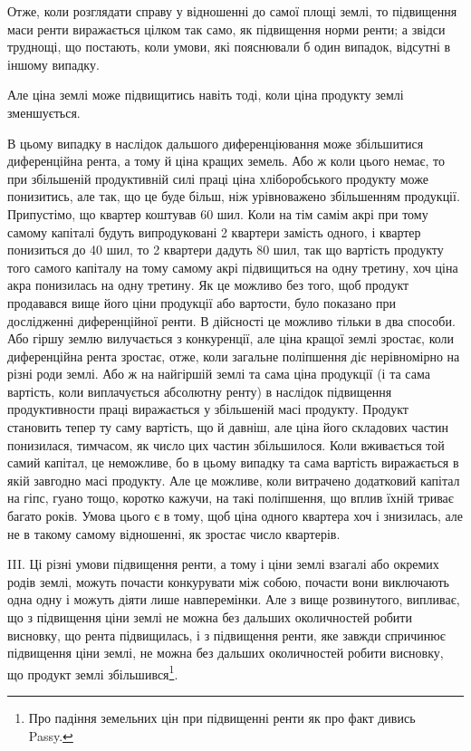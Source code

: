 Отже, коли розглядати справу у відношенні до самої площі землі, то підвищення
маси ренти виражається цілком так само, як підвищення норми ренти;
а звідси труднощі, що постають, коли умови, які пояснювали б один випадок,
відсутні в іншому випадку.

Але ціна землі може підвищитись навіть тоді, коли ціна продукту землі
зменшується.

В цьому випадку в наслідок дальшого диференціювання може збільшитися
диференційна рента, а тому й ціна кращих земель. Або ж коли цього немає, то
при збільшеній продуктивній силі праці ціна хліборобського продукту може понизитись,
але так, що це буде більш, ніж урівноважено збільшенням продукції. Припустімо,
що квартер коштував 60 шил. Коли на тім самім акрі при тому самому
капіталі будуть випродуковані 2 квартери замість одного, і квартер понизиться
до 40 шил, то 2 квартери дадуть 80 шил, так що вартість продукту того самого
капіталу на тому самому акрі підвищиться на одну третину, хоч ціна акра
понизилась на одну третину. Як це можливо без того, щоб продукт продавався
вище його ціни продукції або вартости, було показано при дослідженні диференційної
ренти. В дійсності це можливо тільки в два способи. Або гіршу
землю вилучається з конкуренції, але ціна кращої землі зростає, коли
диференційна рента зростає, отже, коли загальне поліпшення діє нерівномірно
на різні роди землі. Або ж на найгіршій землі та сама ціна продукції
(і та сама вартість, коли виплачується абсолютну ренту) в наслідок підвищення
продуктивности праці виражається у збільшеній масі продукту. Продукт
становить тепер ту саму вартість, що й давніш, але ціна його складових
частин понизилася, тимчасом, як число цих частин збільшилося. Коли вживається
той самий капітал, це неможливе, бо в цьому випадку та сама вартість
виражається в якій завгодно масі продукту. Але це можливе, коли витрачено
додатковий капітал на гіпс, гуано тощо, коротко кажучи, на такі поліпшення,
що вплив їхній триває багато років. Умова цього є в тому, щоб ціна одного квартера
хоч і знизилась, але не в такому самому відношенні, як зростає число квартерів.

III. Ці різні умови підвищення ренти, а тому і ціни землі взагалі або окремих
родів землі, можуть почасти конкурувати між собою, почасти вони виключають
одна одну і можуть діяти лише навперемінки. Але з вище розвинутого, випливає,
що з підвищення ціни землі не можна без дальших околичностей робити
висновку, що рента підвищилась, і з підвищення ренти, яке завжди спричинює
підвищення ціни землі, не можна без дальших околичностей робити висновку,
що продукт землі збільшився\footnote{
Про падіння земельних цін при підвищенні ренти як про факт дивись Passy.
}.

